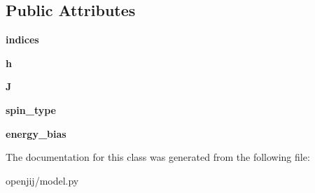 \subsection*{Public Attributes}
\begin{DoxyCompactItemize}
\item 
\mbox{\label{classopenjij_1_1model_1_1_binary_quadratic_model_a4622d684f90a85c55ea5a7ab13a22932}} 
{\bfseries indices}
\item 
\mbox{\label{classopenjij_1_1model_1_1_binary_quadratic_model_a8255008ed024e62302857f532a4c0c15}} 
{\bfseries h}
\item 
\mbox{\label{classopenjij_1_1model_1_1_binary_quadratic_model_a28183a82a64ab86a77c657d07a68efd6}} 
{\bfseries J}
\item 
\mbox{\label{classopenjij_1_1model_1_1_binary_quadratic_model_a42fd592f73560fb77ac4e9e608f43535}} 
{\bfseries spin\+\_\+type}
\item 
\mbox{\label{classopenjij_1_1model_1_1_binary_quadratic_model_a51522682d6d6dd131a51bb5184254957}} 
{\bfseries energy\+\_\+bias}
\end{DoxyCompactItemize}


The documentation for this class was generated from the following file\+:\begin{DoxyCompactItemize}
\item 
openjij/model.\+py\end{DoxyCompactItemize}

